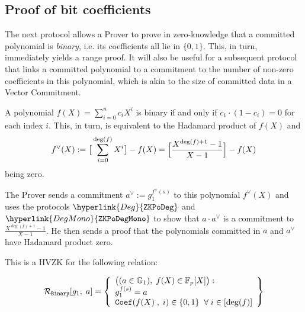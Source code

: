 \documentclass[11pt, lettersize, notitlepage, leqno, footskip=0.6cm]{article}
\newcommand{\bFp}{\mathbb{F}_p}
\newcommand{\mc}{\mathcal}
\newcommand{\mb}{\mathbb}
\newcommand{\vs}{\vspace{-0.15cm}}
\numberwithin{equation}{section}
\begin{document}
\subsection{\fontsize{11}{11}\selectfont Proof of bit coefficients }


The next protocol allows a Prover to prove in zero-knowledge that  a committed polynomial is \textit{binary}, i.e. its coefficients all lie in $\{0,1\}$. This, in turn, immediately yields a range proof. It will also be useful for a subsequent protocol that links a committed polynomial to a commitment to the number of non-zero coefficients in this polynomial, which is akin to the size of committed data in a Vector Commitment.

A polynomial $f(X) = \sum_{i=0}^n c_iX^i$ is binary if and only if $c_1\cdot (1-c_i) = 0$ for each index $i$. This, in turn, is equivalent to the Hadamard product of $f(X)$ and \vs $$f^{\vee}(X):= \big[\sum\limits_{i=0}^{\deg(f)} X^i\big] - f(X) = \Big[\frac{X^{\deg(f)+1}-1}{X-1}\Big] - f(X)  \vs $$ being zero.

The Prover sends a commitment $a^{\vee}:= g_1^{f^{\vee}(s)}$ to this polynomial $f^{\vee}(X)$ and uses the protocols $\hyperlink{Deg}{\tt{ZKPoDeg}}$ and $\hyperlink{DegMono}{\tt{ZKPoDegMono}}$ to show that $a\cdot a^{\vee}$ is a commitment to $\frac{X^{\deg(f)+1}-1}{X-1}$. He then sends a proof that the polynomials committed in $a$ and $a^{\vee}$ have Hadamard product zero.


This is a HVZK for the following relation: \vs 

$$\mc{R}_{\tt{Binary}}[g_1,\;a] = \left\{\begin{array}{l} \big( (a\in\mb{G}_1),\;
f(X)\in \bFp[X]\big): \\
g_1^{f(s)} = a\\ 
{\tt{Coef}}(f(X)\;,\; i)\in\{0,1\} \;\;\forall\;i\in [\deg(f)]
\end{array}\right\}  $$





\vspace{2mm}
\end{document}
